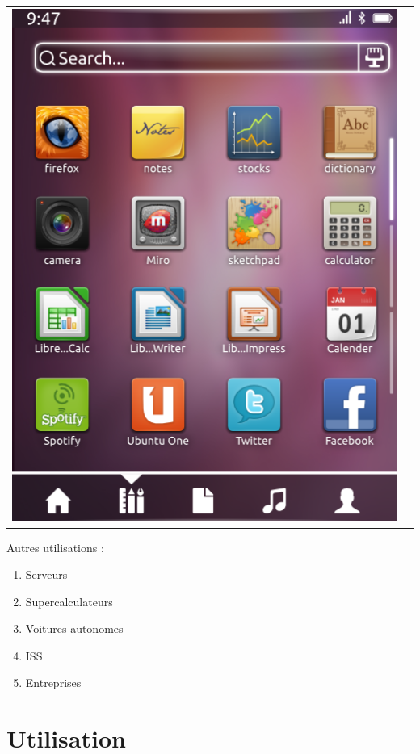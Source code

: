 \documentclass{beamer}
\begin{document}
\begin{frame}
\begin{tabular}{c c}
\begin{minipage}{0.4\linewidth}
\includegraphics[width=\linewidth]{images/phone}
\end{minipage}
\end{tabular}
\end{frame}

\begin{frame}
Autres utilisations :
\begin{enumerate}
\item Serveurs
\item Supercalculateurs
\item Voitures autonomes
\item ISS
\item Entreprises
\end{enumerate}
\end{frame}

\section{Utilisation}
\end{document}
